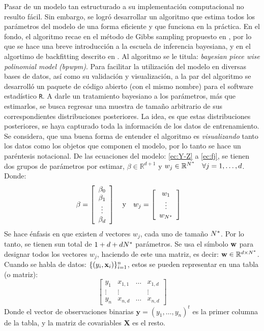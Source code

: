 \documentclass[../Main/Main.tex]{subfiles}
\begin{document}
Pasar de un modelo tan estructurado a su implementación computacional no resulto fácil. Sin embargo, se logró desarrollar un algoritmo que estima todos los parámetros del modelo de una forma eficiente y que funciona en la práctica. En el fondo, el algoritmo recae en el método de Gibbs sampling propuesto en \autocite{albert1993bayesian}, por lo que se hace una breve introducción a la escuela de inferencia bayesiana, y en el algortimo de backfitting descrito en \autocite{hastie1986generalized}. Al algoritmo se le titula: \textit{bayesian piece wise polinomial model (bpwpm)}. Para facilitar la utilización del modelo en diversas bases de datos, así como  su validación y visualización, a la par del algoritmo se desarrolló un paquete de código abierto (con el mismo nombre) para el software estadístico \verb|R|. A darle un tratamiento bayesiano a los parámetros, más que estimarlos, se busca regresar una muestra de tamaño arbitrario de sus correspondientes distribuciones posteriores. La idea, es que estas distribuciones posteriores, se haya capturado toda la información de los datos de entrenamiento. \\

Se considera, que una buena forma de entender el algoritmo es \textit{visualizando} tanto los datos como los objetos que componen el modelo, por lo tanto se hace un paréntesis notacional. De las ecuaciones del modelo: \ref{ec:Y-Z} a \ref{ec:fj}, se tienen dos grupos de parámetros por estimar, $\beta \in \mathbb{R}^{d+1}$ y $w_j \in \mathbb{R}^{N^*} \quad \forall j = 1,\ldots,d$. Donde:
\begin{align*}
\beta &= 
\left[ 
	\begin{array}{c}
	\beta_0 \\
	\beta_1 \\ 
	\vdots \\
	\beta_d
	\end{array}\right]
\quad \text{y} \quad 
w_j = 
\left[ 
	\begin{array}{c}
	w_1\\
	\vdots\\
	w_{N^*}
	\end{array}\right]
\end{align*}
Se hace énfasis en que existen $d$ vectores $w_j$, cada uno de tamaño $N^*$. Por lo tanto, se tienen sun total de $1 + d + dN^*$ parámetros. Se usa el símbolo $\mathbf{w}$ para designar todos los vectores $w_j$, haciendo de este una matriz, es decir: $\mathbf{w}\in\mathbb{R}^{d\times N^*}$. Cuando se habla de datos: $\{(y_i,\mathbf{x}_i)\}_{i = 1}^n$, estos se pueden  representar en una tabla (o matriz):
$$\left[\begin{array}{c|ccc} 
y_1 & x_{1,1} & \ldots & x_{1,d} \\ 
\vdots & \vdots & ~ & \vdots \\ 
y_n & x_{n,d} & \ldots & x_{n,d}
\end{array}\right]$$
Donde el vector de observaciones binarias $\mathbf{y} = (y_1,\ldots,y_n)^t$ es la primer columna de la tabla, y la matriz de covariables $\mathbf{X}$ es el resto.\\
\end{document}
